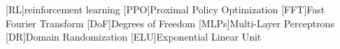 \begin{acronym}
[RL]{reinforcement learning}
[PPO]{Proximal Policy Optimization}
[FFT]{Fast Fourier Transform}
[DoF]{Degrees of Freedom}
[MLPs]{Multi-Layer Perceptrons}
[DR]{Domain Randomization}
[ELU]{Exponential Linear Unit}
\end{acronym}

